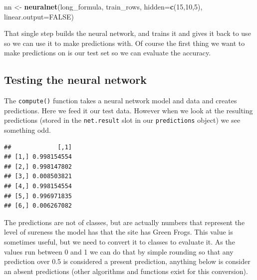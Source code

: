 \documentclass[
]{book}
\newenvironment{Shaded}{\begin{snugshade}}{\end{snugshade}}
\newcommand{\DataTypeTok}[1]{\textcolor[rgb]{0.13,0.29,0.53}{#1}}
\newcommand{\DecValTok}[1]{\textcolor[rgb]{0.00,0.00,0.81}{#1}}
\newcommand{\KeywordTok}[1]{\textcolor[rgb]{0.13,0.29,0.53}{\textbf{#1}}}
\newcommand{\NormalTok}[1]{#1}
\newcommand{\OperatorTok}[1]{\textcolor[rgb]{0.81,0.36,0.00}{\textbf{#1}}}
\newcommand{\OtherTok}[1]{\textcolor[rgb]{0.56,0.35,0.01}{#1}}
\newcommand{\StringTok}[1]{\textcolor[rgb]{0.31,0.60,0.02}{#1}}
\begin{document}
\begin{Shaded}
\begin{Highlighting}[]
\NormalTok{nn <-}\StringTok{ }\KeywordTok{neuralnet}\NormalTok{(long_formula, train_rows, }\DataTypeTok{hidden=}\KeywordTok{c}\NormalTok{(}\DecValTok{15}\NormalTok{,}\DecValTok{10}\NormalTok{,}\DecValTok{5}\NormalTok{), }\DataTypeTok{linear.output=}\OtherTok{FALSE}\NormalTok{)}
\end{Highlighting}
\end{Shaded}

That single step builds the neural network, and trains it and gives it back to use so we can use it to make predictions with. Of course the first thing we want to make predictions on is our test set so we can evaluate the accuracy.

\hypertarget{testing-the-neural-network}{%
\subsection{Testing the neural network}\label{testing-the-neural-network}}

The \texttt{compute()} function takes a neural network model and data and creates predictions. Here we feed it our test data. However when we look at the resulting predictions (stored in the \texttt{net.result} slot in our \texttt{predictions} object) we see something odd.

\begin{Shaded}
\end{Shaded}

\begin{verbatim}
##             [,1]
## [1,] 0.998154554
## [2,] 0.998147802
## [3,] 0.008503821
## [4,] 0.998154554
## [5,] 0.996971835
## [6,] 0.006267082
\end{verbatim}

The predictions are not of classes, but are actually numbers that represent the level of sureness the model has that the site has Green Frogs. This value is sometimes useful, but we need to convert it to classes to evaluate it. As the values run between 0 and 1 we can do that by simple rounding so that any prediction over 0.5 is considered a present prediction, anything below is consider an absent predictions (other algorithms and functions exist for this conversion).
\end{document}
